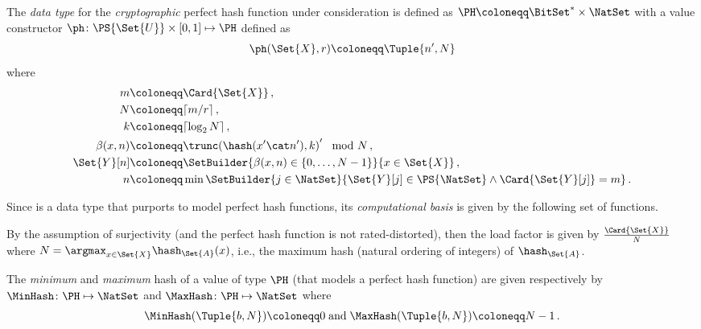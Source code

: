 \documentclass[ ../main.tex]{subfiles}
\begin{document}
\begin{definition}
The \emph{data type} for the \emph{cryptographic} perfect hash function under consideration is defined as $\PH \coloneqq \BitSet^* \times \NatSet$ with a value constructor $\ph \colon \PS{\Set{U}} \times [0,1] \mapsto \PH$ defined as
\begin{equation}
	\ph(\Set{X}, r) \coloneqq \Tuple{n',N}
\end{equation}
where
\begin{equation}
\begin{split}
m			&\coloneqq \Card{\Set{X}}\,,\\
N 			&\coloneqq \lceil m / r \rceil\,,\\
k			&\coloneqq \lceil\log_2 N\rceil\,,\\
\beta(x,n) 	&\coloneqq \trunc\!\left(\hash(x' \cat n'),k\right)' \mod N\,,\\
\Set{Y}[n] 	&\coloneqq \SetBuilder{\beta(x,n) \in \{0,\ldots,N-1\}}{x \in \Set{X}}\,,\\
n 			& \coloneqq \min{\SetBuilder{ j \in \NatSet }{ \Set{Y}[j] \in \PS{\NatSet} \land \Card{\Set{Y}[j]} = m}}\,.
\end{split}
\end{equation}
\end{definition}








Since \PH is a data type that purports to model perfect hash functions, its \emph{computational basis} is given by the following set of functions.

By the assumption of surjectivity (and the perfect hash function is not rated-distorted), then the load factor is given by $\frac{\Card{\Set{X}}}{N}$ where $N = \argmax_{x \in \Set{X}} \hash_{\Set{A}}(x)$, i.e., the maximum hash (natural ordering of integers) of $\hash_{\Set{A}}$.
\begin{definition}
The \emph{minimum} and \emph{maximum} hash of a value of type $\PH$ (that models a perfect hash function) are given respectively by $\MinHash \colon \PH \mapsto \NatSet$ and $\MaxHash \colon \PH \mapsto \NatSet$ where
\begin{equation}
	\MinHash(\Tuple{b,N}) \coloneqq 0\;\text{and}\;\MaxHash(\Tuple{b,N}) \coloneqq N-1\,.
\end{equation}
\end{definition}
\end{document}
